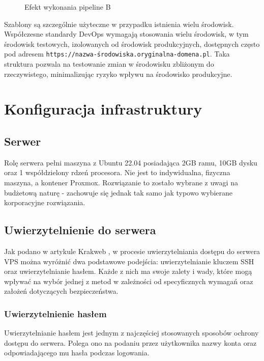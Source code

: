 \documentclass{article}
\begin{document}
\begin{figure}[H]
\begin{minipage}[b]{0.45\textwidth}
        \caption{Efekt wykonania pipeline B}
        \label{fig:enter-label-b}
    \end{minipage}
\end{figure}

Szablony są szczególnie użyteczne w przypadku istnienia wielu środowisk. Współczesne standardy DevOps wymagają stosowania wielu środowisk, w tym środowisk testowych, izolowanych od środowisk produkcyjnych, dostępnych często pod adresem \lstinline|https://nazwa-środowiska.oryginalna-domena.pl|. Taka struktura pozwala na testowanie zmian w środowisku zbliżonym do rzeczywistego, minimalizując ryzyko wpływu na środowisko produkcyjne.

\section{Konfiguracja infrastruktury}

\subsection{Serwer}

Rolę serwera pełni maszyna z Ubuntu 22.04 posiadająca 2GB ramu, 10GB dysku oraz 1 współdzielony rdzeń procesora. Nie jest to indywidualna, fizyczna maszyna, a kontener Proxmox. Rozwiązanie to zostało wybrane z uwagi na budżetową naturę - zachowuje się jednak tak samo jak typowo wybierane korporacyjne rozwiązania.

\subsection{Uwierzytelnienie do serwera}

Jak podano w artykule Krakweb \cite{Krakweb}, w procesie uwierzytelniania dostępu do serwera VPS można wyróżnić dwa podstawowe podejścia: uwierzytelnianie kluczem SSH oraz uwierzytelnianie hasłem. Każde z nich ma swoje zalety i wady, które mogą wpływać na wybór jednej z metod w zależności od specyficznych wymagań oraz założeń dotyczących bezpieczeństwa.

\subsubsection{Uwierzytelnienie hasłem}

Uwierzytelnianie hasłem jest jednym z najczęściej stosowanych sposobów ochrony dostępu do serwera. Polega ono na podaniu przez użytkownika nazwy konta oraz odpowiadającego mu hasła podczas logowania.
\end{document}
